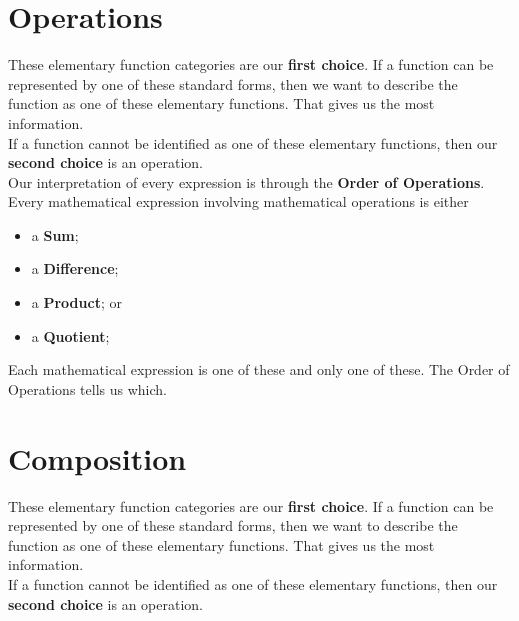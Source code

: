 \documentclass{ximera}
\begin{document}
\section*{Operations}


These elementary function categories are our \textbf{first choice}.  If a function can be represented by one of these standard forms, then we want to describe the function as one of these elementary functions.  That gives us the most information. \\


If a function cannot be identified as one of these elementary functions, then our \textbf{second choice} is an operation. \\


Our interpretation of every expression is through the \textbf{\textcolor{purple!85!blue}{Order of Operations}}. \\

Every mathematical expression involving mathematical operations is either

\begin{itemize}
	\item a \textbf{Sum};
	\item a \textbf{Difference};
	\item a \textbf{Product}; or 
	\item a \textbf{Quotient};
\end{itemize}



Each mathematical expression is one of these and only one of these.  The Order of Operations tells us which.













\section*{Composition}


These elementary function categories are our \textbf{first choice}.  If a function can be represented by one of these standard forms, then we want to describe the function as one of these elementary functions.  That gives us the most information. \\


If a function cannot be identified as one of these elementary functions, then our \textbf{second choice} is an operation. \\
\end{document}
